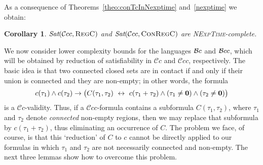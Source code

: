 \documentclass{LMCS}
\theoremstyle{plain}
\newtheorem{corollary}[thm]{Corollary}
\newcommand{\cBC}{\ensuremath{\mathcal{C}}}
\newcommand{\cBCc}{\ensuremath{\cBC{}c}} \newcommand{\cBCcc}{\ensuremath{\cBC{}cc}}
\newcommand{\Sat}{\textit{Sat}}
\newcommand{\Regc}{\textsc{RegC}}
\newcommand{\ConR}{\textsc{ConRegC}}
\newcommand{\NExpTime}{\textsc{NExpTime}}
\begin{document}
As a consequence of Theorems~\ref{theo:conTcInNexptime} and~\ref{nexptime} we obtain:
\begin{corollary}\label{cor:nexptimeComplete}
$\Sat(\cBCcc,\Regc)$ and $\Sat(\cBCcc,\ConR)$ are \NExpTime{}-complete.
\end{corollary}

We now consider lower complexity bounds for the languages $\mathcal{B}c$ and
$\mathcal{B}cc$, which will be obtained by reduction of satisfiability in
$\cBCc$ and $\cBCcc$,
respectively. The basic idea is that two connected closed
sets are in contact if and only if their union is connected and they are non-empty; in other words, the
formula
\begin{equation*}
c(\tau_1) \land c(\tau_2) \to \bigl(C(\tau_1,\tau_2)\
\leftrightarrow \ c(\tau_1 + \tau_2) \land (\tau_1 \ne\mathbf{0}) \land (\tau_2\ne\mathbf{0})\bigr)
\end{equation*}
is a
$\cBCc$-validity. Thus, if a $\cBCcc$-formula contains a subformula
$C(\tau_1,\tau_2)$, where $\tau_1$ and $\tau_2$ denote
\emph{connected} non-empty regions, then we may replace that subformula by
$c(\tau_1 + \tau_2)$, thus eliminating an occurrence of $C$.
The problem we face, of course, is that this `reduction' of $C$ to $c$
cannot be directly applied to our formulas in which $\tau_1$ and
$\tau_2$ are not necessarily connected and non-empty. The next three lemmas show how
to overcome this problem.
\end{document}
